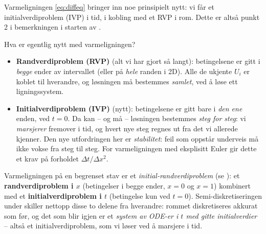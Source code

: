Varmeligningen \eqref{eq:diffeq} bringer inn noe prinsipielt nytt: vi får et initialverdiproblem (IVP) i tid, i kobling med et RVP i rom. Dette er altså punkt 2 i bemerkningen i starten av .

\begin{oppsum}{Hva er egentlig nytt med varmeligningen?}
\begin{itemize}
\item \textbf{Randverdiproblem (RVP)} (alt vi har gjort så langt): betingelsene er gitt i \emph{begge} ender av intervallet (eller på \emph{hele} randen i 2D). Alle de ukjente $U_i$ er koblet til hverandre, og løsningen må bestemmes \emph{samlet}, ved å løse ett ligningssystem.
\item \textbf{Initialverdiproblem (IVP)} (nytt): betingelsene er gitt bare i \emph{den ene} enden, ved $t=0$. Da kan -- og må -- løsningen bestemmes \emph{steg for steg}: vi \emph{marsjerer} fremover i tid, og hvert nye steg regnes ut fra det vi allerede kjenner. Den nye utfordringen her er \emph{stabilitet}: feil som oppstår underveis må ikke vokse fra steg til steg. For varmeligningen med eksplisitt Euler gir dette et krav på forholdet $\Delta t/\Delta x^2$.
\end{itemize}
Varmeligningen på en begrenset stav er et \emph{initial-randverdiproblem} (se ): et \textbf{randverdiproblem i $x$} (betingelser i begge ender, $x=0$ og $x=1$) kombinert med et \textbf{initialverdiproblem i $t$} (betingelse kun ved $t=0$). Semi-diskretiseringen under skiller nettopp disse to delene fra hverandre: rommet diskretiseres akkurat som før, og det som blir igjen er et \emph{system av ODE-er i $t$ med gitte initialverdier} -- altså et initialverdiproblem, som vi løser ved å marsjere i tid.
\end{oppsum}

